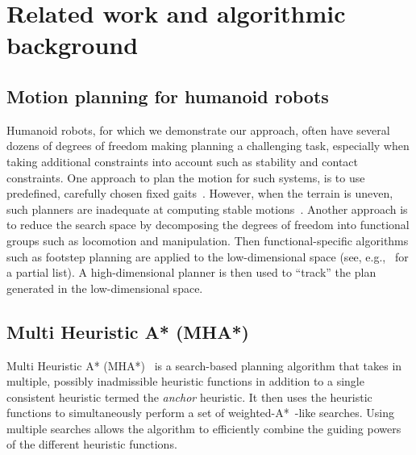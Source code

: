\documentclass{article}
\begin{document}
\section{Related work and algorithmic background}
\subsection{Motion planning for humanoid robots}
\label{sec:rel}
Humanoid robots, for which we demonstrate our approach, often have several dozens of degrees of freedom making planning a challenging task, especially when taking additional constraints into account such as stability and contact constraints.
One approach to plan the motion for such systems, is to use predefined, carefully chosen fixed gaits~\cite{KKKHKHAI04}. 
However, when the terrain is uneven, such planners are inadequate at computing stable motions~\cite{HBLHW08}.
Another approach is to reduce the search space by decomposing the degrees of freedom into functional groups such as locomotion and manipulation.
Then functional-specific algorithms such as footstep planning are applied to the low-dimensional space (see, e.g.,~\cite{CLCKHK05,KNKII01,PSBLY12,XCXZC09,KKNII02} for a partial list).
A high-dimensional planner is then used to ``track'' the plan generated in the low-dimensional space.

 
\subsection{Multi Heuristic A* (MHA*)}
\label{sec:mha}
Multi Heuristic A* (MHA*)~\cite{ASNHL16,NAL15} is a search-based planning algorithm that takes in multiple, possibly inadmissible heuristic functions in addition to a single consistent heuristic termed the \emph{anchor} heuristic.
It then uses the heuristic functions to simultaneously perform a set of weighted-A*~\cite{pohl1970first}-like searches.
Using multiple searches allows the algorithm to efficiently combine the guiding powers of the different heuristic functions. 
\end{document}
